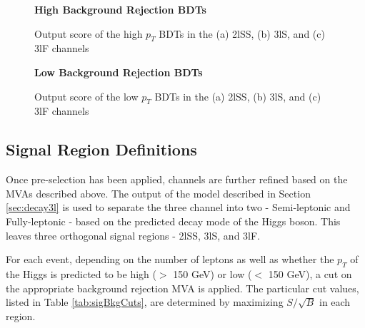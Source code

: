 \begin{figure}
  \centering
  \textbf{High \pt Background Rejection BDTs}
  \\
  \caption{Output score of the high $p_T$ BDTs in the (a) 2lSS, (b) 3lS, and (c) 3lF channels}
  \label{fig:sigBkgScoreHigh}
\end{figure}

\begin{figure}
  \centering
  \textbf{Low \pt Background Rejection BDTs}
  \\
  \label{fig:sigBkgScoreLow}
  \caption{Output score of the low $p_T$ BDTs in the (a) 2lSS, (b) 3lS, and (c) 3lF channels} 
\end{figure}


\subsection{Signal Region Definitions}
\label{subsec:sigRegions}

Once pre-selection has been applied, channels are further refined based on the MVAs described above. The output of the model described in Section \ref{sec:decay3l} is used to separate the three channel into two - Semi-leptonic and Fully-leptonic - based on the predicted decay mode of the Higgs boson. This leaves three orthogonal signal regions - 2lSS, 3lS, and 3lF. 

For each event, depending on the number of leptons as well as whether the $p_T$ of the Higgs is predicted to be high ($>$ 150 GeV) or low ($<$ 150 GeV), a cut on the appropriate background rejection MVA is applied. The particular cut values, listed in Table \ref{tab:sigBkgCuts}, are determined by maximizing $S/\sqrt{B}$ in each region. 

